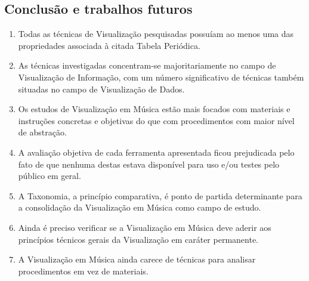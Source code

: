 \documentclass{sciposter}
\begin{document}
\begin{multicols}{3}

\section{Conclusão e trabalhos futuros}

\begin{enumerate}
\item Todas as técnicas de Visualização pesquisadas possuíam ao menos uma das
propriedades associada à citada Tabela Periódica.
\item As técnicas investigadas concentram-se majoritariamente no campo de
Visualização de Informação, com um número significativo de técnicas também
situadas no campo de Visualização de Dados.
\item Os estudos de Visualização em Música estão mais focados com materiais e
instruções concretas e objetivas do que com procedimentos com maior nível de
abstração.
\item A avaliação objetiva de cada ferramenta apresentada ficou prejudicada pelo
fato de que nenhuma destas estava disponível para uso e/ou testes pelo público
em geral.
\item A Taxonomia, a princípio comparativa, é ponto de partida determinante para
a consolidação da Visualização em Música como campo de estudo.
\item Ainda é preciso verificar se a Visualização em Música deve aderir aos
princípios técnicos gerais da Visualização em caráter permanente.
\item A Visualização em Música ainda carece de técnicas para analisar
procedimentos em vez de materiais.
\end{enumerate}

\renewcommand{\refname}{Bibliografia}

\nocite{Lengler2007}



\end{multicols}
\end{document}
